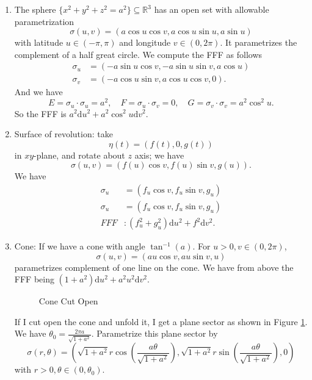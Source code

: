 \begin{example}
    \leavevmode
    \begin{enumerate}
        \item The sphere \(\{x^2 + y^2 + z^2 = a^2\}\subseteq \mathbb{R}^3\) has an open set with allowable parametrization
        \[
            \sigma(u,v) = (a\cos u\cos v,a\cos u\sin u,a\sin u)
        \]
        with latitude \(u \in (-\pi, \pi)\) and longitude \(v \in (0, 2\pi)\). It parametrizes the complement of a half great circle. We compute the FFF as follows
        \begin{align*}
            \sigma_u &= (-a\sin u\cos v, -a\sin u\sin v,a\cos u)\\
            \sigma_v &= (-a\cos u\sin v,a\cos u\cos v,0).
        \end{align*}
        And we have
        \[
            E = \sigma_{u} \cdot \sigma_u = a^2, \quad F=\sigma_u \cdot \sigma_v = 0, \quad G = \sigma_v \cdot \sigma_v = a^{2}\cos^{2}u.
        \]
        So the FFF is \(a^2 \mathrm{d}u^2 + a^2 \cos ^2 u \mathrm{d}v^2\).
        \item Surface of revolution: take
        \[
            \eta(t) = (f(t), 0, g(t))
        \]
        in \(xy\)-plane, and rotate about \(z\) axis; we have
        \[
            \sigma(u,v) = (f(u)\cos v, f(u) \sin v,g(u)).
        \]
        We have
        \begin{align*}
            \sigma_u &= (f_u \cos v, f_u \sin v, g_u)\\
            \sigma_u &= (f_u \cos v, f_u \sin v, g_u)\\
            FFF&:(f_u^2 + g_u^2)\mathrm{d}u^2 + f^2\mathrm{d}v^2.
        \end{align*}
        \item Cone: If we have a cone with angle \(\tan^{-1}(a)\). For \(u>0, v\in (0,2\pi)\),
        \[
            \sigma(u,v) = (au\cos v, au\sin v, u)
        \]
        parametrizes complement of one line on the cone. We have from above the FFF being \((1+a^2)\mathrm{d}u^2 + a^{2}u^2\mathrm{d}v^2\).
        
        \begin{figure}[H]
            \centering
            \caption{Cone Cut Open}
            \label{cutcone}
        \end{figure}
        If I cut open the cone and unfold it, I get a plane sector as shown in Figure \ref{cutcone}. We have \(\theta_0 = \frac{2\pi a}{\sqrt{1 + a^2} }\). Parametrize this plane sector by
        \[
            \sigma(r, \theta) = (\sqrt{1 + a^2}r\cos\left(\frac{a\theta}{\sqrt{1 + a^2} }\right),\sqrt{1 + a^2}r\sin\left(\frac{a\theta}{\sqrt{1 + a^2} }\right),0)
        \]
        with \(r > 0, \theta \in (0, \theta_0)\).
        

\end{enumerate}
\end{example}
